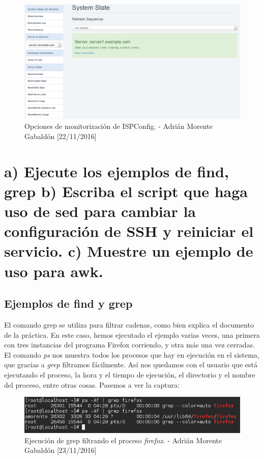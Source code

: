\begin{figure}[H]
	\centering
	\includegraphics[scale=0.3]{ispconfig-server}
	\caption{Opciones de monitorización de ISPConfig. - Adrián Morente Gabaldón [22/11/2016]}
	\label{fig:figura12}
\end{figure}

\section{a) Ejecute los ejemplos de find, grep b) Escriba el script que haga uso de sed para cambiar la configuración de SSH y reiniciar el servicio. c) Muestre un ejemplo de uso para awk.}

	\subsection{Ejemplos de find y grep}
	El comando grep se utiliza para filtrar cadenas, como bien explica el documento de la práctica. En este caso, hemos ejecutado el ejemplo varias veces, una primera con tres instancias del programa Firefox corriendo, y otra más una vez cerradas. El comando \emph{ps} nos muestra todos los procesos que hay en ejecución en el sistema, que gracias a \emph{grep} filtramos fácilmente. Así nos quedamos con el usuario que está ejecutando el proceso, la hora y el tiempo de ejecución, el directorio y el nombre del proceso, entre otras cosas. Pasemos a ver la captura:
	\begin{figure}[H]
		\centering
		\includegraphics[scale=0.8]{ps-grep}
		\caption{Ejecución de grep filtrando el proceso \emph{firefox}. - Adrián Morente Gabaldón [23/11/2016]}
		\label{fig:figura13}
	\end{figure}

